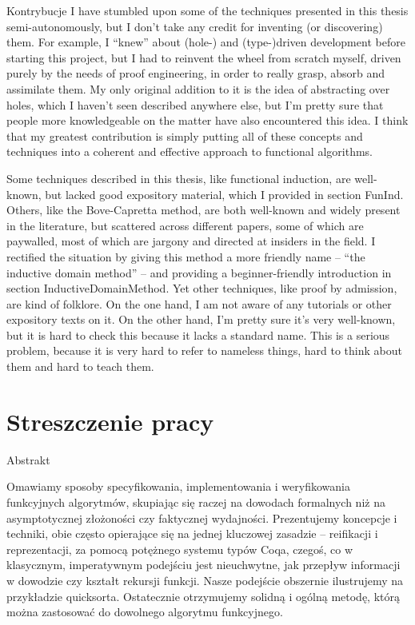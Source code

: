 \documentclass{beamer}
\begin{document}
\begin{frame}{Kontrybucje}
	I have stumbled upon some of the techniques presented in this thesis semi-autonomously, but I don't take any credit for inventing (or discovering) them. For example, I ``knew'' about (hole-) and (type-)driven development before starting this project, but I had to reinvent the wheel from scratch myself, driven purely by the needs of proof engineering, in order to really grasp, absorb and assimilate them. My only original addition to it is the idea of abstracting over holes, which I haven't seen described anywhere else, but I'm pretty sure that people more knowledgeable on the matter have also encountered this idea. I think that my greatest contribution is simply putting all of these concepts and techniques into a coherent and effective approach to functional algorithms.

	Some techniques described in this thesis, like functional induction, are well-known, but lacked good expository material, which I provided in section FunInd. Others, like the Bove-Capretta method, are both well-known and widely present in the literature, but scattered across different papers, some of which are paywalled, most of which are jargony and directed at insiders in the field. I rectified the situation by giving this method a more friendly name -- ``the inductive domain method'' -- and providing a beginner-friendly introduction in section InductiveDomainMethod. Yet other techniques, like proof by admission, are kind of folklore. On the one hand, I am not aware of any tutorials or other expository texts on it. On the other hand, I'm pretty sure it's very well-known, but it is hard to check this because it lacks a standard name. This is a serious problem, because it is very hard to refer to nameless things, hard to think about them and hard to teach them.
\end{frame}

\section{Streszczenie pracy}

\begin{frame}{Abstrakt}
\begin{center}
	Omawiamy sposoby specyfikowania, implementowania i weryfikowania funkcyjnych algorytmów, skupiając się raczej na dowodach formalnych niż na asymptotycznej złożoności czy faktycznej wydajności. Prezentujemy koncepcje i techniki, obie często opierające się na jednej kluczowej zasadzie -- reifikacji i reprezentacji, za pomocą potężnego systemu typów Coqa, czegoś, co w klasycznym, imperatywnym podejściu jest nieuchwytne, jak przepływ informacji w dowodzie czy kształt rekursji funkcji. Nasze podejście obszernie ilustrujemy na przykładzie quicksorta. Ostatecznie otrzymujemy solidną i ogólną metodę, którą można zastosować do dowolnego algorytmu funkcyjnego.
\end{center}
\end{frame}
\end{document}
